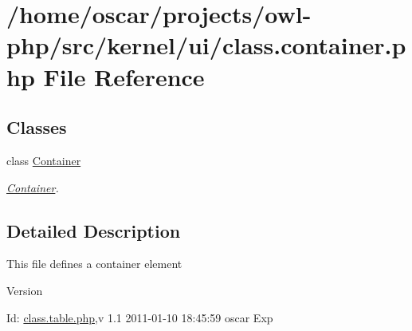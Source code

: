 \section{/home/oscar/projects/owl-\/php/src/kernel/ui/class.container.php File Reference}
\label{kernel_2ui_2class_8container_8php}
\subsection*{Classes}
\begin{DoxyCompactItemize}
\item 
class \hyperlink{classContainer}{Container}
\begin{DoxyCompactList}\small\item\em \hyperlink{classContainer}{Container}. \item\end{DoxyCompactList}\end{DoxyCompactItemize}


\subsection{Detailed Description}
This file defines a container element \begin{DoxyVersion}{Version}

\end{DoxyVersion}
\begin{DoxyParagraph}{Id:}
\hyperlink{class_8table_8php}{class.table.php},v 1.1 2011-\/01-\/10 18:45:59 oscar Exp 
\end{DoxyParagraph}
